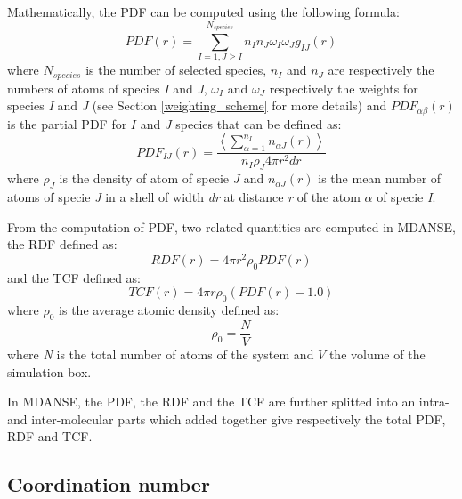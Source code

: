 \documentclass[a4paper,11pt]{article}
\begin{document}
Mathematically, the \gls{PDF} can be computed using the following formula:
\begin{equation}
PDF(r)=\sum\limits_{I = 1,J\geq I}^{N_{species}}n_In_J \omega_I \omega_J g_{IJ}(r)
\end{equation}
where $N_{species}$ is the number of selected species, $n_I$ and $n_J$ are respectively the numbers of atoms of species
\textit{I} and \textit{J}, $\omega_I$ and $\omega_J$ respectively the weights for species \textit{I} and \textit{J}
(see Section \ref{weighting_scheme} for more details) and $PDF_{\alpha\beta}(r)$ is the partial \gls{PDF} for $I$
and $J$ species that can be defined as:
\begin{equation}
\label{eq:gij}
PDF_{IJ}(r) = \frac{\left\langle\sum\limits_{\alpha = 1}^{n_I} n_{\alpha J}(r)\right\rangle}{n_I\rho_J 4\pi r^2dr}
\end{equation}
where $\rho_J$ is the density of atom of specie \textit{J} and $n_{\alpha J}(r)$ is the mean number of atoms of specie
\textit{J} in a shell of width \textit{dr} at distance \textit{r} of the atom $\alpha$ of specie \textit{I}.

From the computation of \gls{PDF}, two related quantities are computed in \gls{MDANSE}, the \gls{RDF} defined as:
\begin{equation}
RDF(r) = 4 \pi r^2 \rho_0 PDF(r)
\end{equation}
and the \gls{TCF} defined as:
\begin{equation}
TCF(r) = 4\pi r \rho_0 (PDF(r) - 1.0)
\end{equation}
where $\rho_0$ is the average atomic density defined as:
\begin{equation}
\rho_0 = \frac{N}{V}
\end{equation}
where \textit{N} is the total number of atoms of the system and $V$ the volume of the simulation box.

In \gls{MDANSE}, the \gls{PDF}, the \gls{RDF} and the \gls{TCF} are further splitted into an intra-and inter-molecular parts
which added together give respectively the total \gls{PDF}, \gls{RDF} and \gls{TCF}.

\subsection{Coordination number}
\label{cn}
\end{document}
